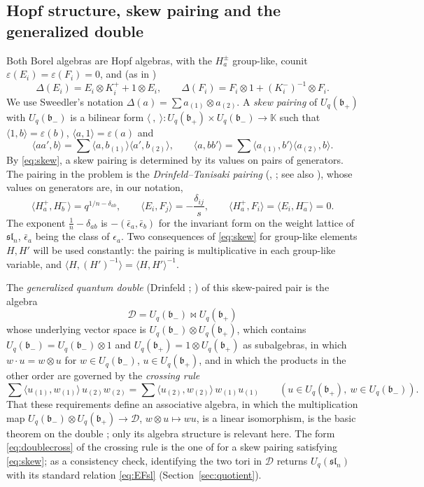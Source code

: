 \documentclass[11pt]{article}
\theoremstyle{remark}
\newcommand{\kk}{\mathbb K}
\newcommand{\U}{U_q}
\newcommand{\slN}{\mathfrak{sl}_n}
\newcommand{\bp}{\mathfrak b_+}
\newcommand{\bm}{\mathfrak b_-}
\newcommand{\ot}{\otimes}
\newcommand{\la}{\langle}
\newcommand{\ra}{\rangle}
\newcommand{\cD}{\mathcal D}
\begin{document}
\subsection{Hopf structure, skew pairing and the generalized double}

Both Borel algebras are Hopf algebras, with the $H^\pm_a$ group-like,
counit $\varepsilon(E_i)=\varepsilon(F_i)=0$, and (as in \cite[Chapter 6]{KS})
\begin{equation}\label{eq:coproduct}
 \Delta(E_i)=E_i\ot K^+_i+1\ot E_i,\qquad
 \Delta(F_i)=F_i\ot1+(K^-_i)^{-1}\ot F_i .
\end{equation}
We use Sweedler's notation $\Delta(a)=\sum a_{(1)}\ot a_{(2)}$. A
\emph{skew pairing} of $\U(\bp)$ with $\U(\bm)$ is a bilinear form
$\la\ ,\ \ra:\U(\bp)\times\U(\bm)\to\kk$ such that
$\la1,b\ra=\varepsilon(b)$, $\la a,1\ra=\varepsilon(a)$ and
\begin{equation}\label{eq:skew}
 \la aa',b\ra=\sum\la a,b_{(1)}\ra\la a',b_{(2)}\ra,\qquad
 \la a,bb'\ra=\sum\la a_{(1)},b'\ra\la a_{(2)},b\ra .
\end{equation}
By \eqref{eq:skew}, a skew pairing is determined by its values on pairs
of generators. The pairing in the problem is the
\emph{Drinfeld--Tanisaki pairing}
(\cite[Section 6.3.1]{KS}, \cite{Ta}; see also \cite[Section 13]{Dr}),
whose values on generators are, in our notation,
\begin{equation}\label{eq:pairing}
 \la H^+_a,H^-_b\ra=q^{1/n-\delta_{ab}},\qquad
 \la E_i,F_j\ra=-\frac{\delta_{ij}}s,\qquad
 \la H^+_a,F_i\ra=\la E_i,H^-_a\ra=0 .
\end{equation}
The exponent $\frac1n-\delta_{ab}$ is $-(\bar\epsilon_a,\bar\epsilon_b)$
for the invariant form on the weight lattice of $\slN$, $\bar\epsilon_a$
being the class of $\epsilon_a$. Two consequences of \eqref{eq:skew} for group-like
elements $H,H'$ will be used constantly: the pairing is multiplicative
in each group-like variable, and $\la H,(H')^{-1}\ra=\la H,H'\ra^{-1}$.

The \emph{generalized quantum double} (Drinfeld \cite[Section 13]{Dr};
\cite[Section 8.2.1]{KS}) of this skew-paired pair is the algebra
\[
 \cD=\U(\bm)\bowtie\U(\bp)
\]
whose underlying vector space is $\U(\bm)\ot\U(\bp)$, which contains
$\U(\bm)=\U(\bm)\ot1$ and $\U(\bp)=1\ot\U(\bp)$ as subalgebras, in which
$w\cdot u=w\ot u$ for $w\in\U(\bm)$, $u\in\U(\bp)$, and in which the
products in the other order are governed by the \emph{crossing rule}
\begin{equation}\label{eq:doublecross}
 \sum\la u_{(1)},w_{(1)}\ra\,u_{(2)}w_{(2)}
 =\sum\la u_{(2)},w_{(2)}\ra\,w_{(1)}u_{(1)}
 \qquad(u\in\U(\bp),\ w\in\U(\bm)).
\end{equation}
That these requirements define an associative algebra, in which the
multiplication map $\U(\bm)\ot\U(\bp)\to\cD$, $w\ot u\mapsto wu$, is a
linear isomorphism, is the basic theorem on the double
\cite[Section 8.2.1]{KS}; only its algebra structure is relevant here.
The form \eqref{eq:doublecross} of the crossing rule is the one of
\cite[Section 8.2.1]{KS} for a skew pairing satisfying \eqref{eq:skew};
as a consistency check, identifying the two tori in $\cD$ returns
$\U(\slN)$ with its standard relation \eqref{eq:EFsl}
(Section~\ref{sec:quotient}).
\end{document}

